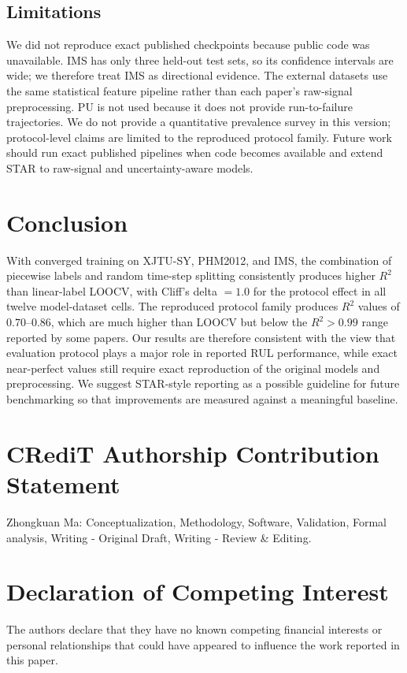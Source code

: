 \documentclass[5p,twocolumn]{elsarticle}
\begin{document}
\subsection{Limitations}
We did not reproduce exact published checkpoints because public code was unavailable. IMS has only three held-out test sets, so its confidence intervals are wide; we therefore treat IMS as directional evidence. The external datasets use the same statistical feature pipeline rather than each paper's raw-signal preprocessing. PU is not used because it does not provide run-to-failure trajectories. We do not provide a quantitative prevalence survey in this version; protocol-level claims are limited to the reproduced protocol family. Future work should run exact published pipelines when code becomes available and extend STAR to raw-signal and uncertainty-aware models.

\section{Conclusion}
With converged training on XJTU-SY, PHM2012, and IMS, the combination of piecewise labels and random time-step splitting consistently produces higher $R^2$ than linear-label LOOCV, with Cliff's delta $=1.0$ for the protocol effect in all twelve model-dataset cells. The reproduced protocol family produces $R^2$ values of $0.70$--$0.86$, which are much higher than LOOCV but below the $R^2>0.99$ range reported by some papers. Our results are therefore consistent with the view that evaluation protocol plays a major role in reported RUL performance, while exact near-perfect values still require exact reproduction of the original models and preprocessing. We suggest STAR-style reporting as a possible guideline for future benchmarking so that improvements are measured against a meaningful baseline.

\section*{CRediT Authorship Contribution Statement}
Zhongkuan Ma: Conceptualization, Methodology, Software, Validation, Formal analysis, Writing - Original Draft, Writing - Review \& Editing.

\section*{Declaration of Competing Interest}
The authors declare that they have no known competing financial interests or personal relationships that could have appeared to influence the work reported in this paper.
\end{document}
